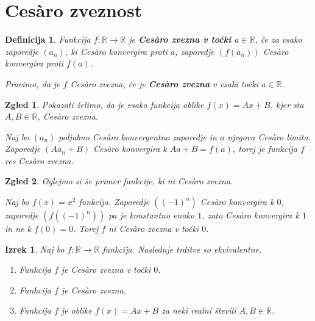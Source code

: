 \documentclass[10pt,hyperref={unicode}]{beamer}
\newtheorem{izrek}{Izrek}
\newtheorem{definicija}{Definicija}
\newtheorem{zgled}{Zgled}
\begin{document}
\section{Ces\`{a}ro zveznost}

\begin{frame}
    \begin{definicija}
        Funkcija $f: \mathbb{R} \rightarrow \mathbb{R}$ je \textbf{Ces\`{a}ro zvezna v točki $a \in \mathbb{R}$}, če za vsako zaporedje $(a_n)$, ki Ces\`{a}ro konvergira proti $a$, zaporedje $(f(a_n))$ Ces\`{a}ro konvergira proti $f(a)$. 
        
        Pravimo, da je $f$ Ces\`{a}ro zvezna, če je \textbf{Ces\`{a}ro zvezna} v vsaki točki $a \in \mathbb{R}$.
    \end{definicija}
\end{frame}

\begin{frame}
    \begin{zgled}
        Pokazati želimo, da je vsaka funkcija oblike $f(x) = Ax + B$, kjer sta $A, B \in \mathbb{R}$, Ces\`{a}ro zvezna. 
        \pause

        Naj bo $(a_n)$ poljubno Ces\`{a}ro konvergentno zaporedje in $a$ njegova Ces\`{a}ro limita. Zaporedje $(A a_n + B)$ Ces\`{a}ro konvergira k $A a + B = f(a)$, torej je funkcija $f$ res Ces\`{a}ro zvezna.
    \end{zgled}
    \pause
    \begin{zgled}
        Oglejmo si še primer funkcije, ki ni Ces\`{a}ro zvezna. 
        \pause

        Naj bo $f(x) = x^2$ funkcija. Zaporedje $((-1)^n)$ Ces\`{a}ro konvergira k $0$, zaporedje $(f((-1)^n))$ pa je konstantno enako $1$, zato Ces\`{a}ro konvergira k $1$ in ne k $f(0) = 0$. Torej $f$ ni Ces\`{a}ro zvezna v točki $0$.
    \end{zgled}
\end{frame}

\begin{frame}
    \begin{izrek}
        \label{klaszvez}
        Naj bo $f: \mathbb{R} \rightarrow \mathbb{R}$ funkcija. Naslednje trditve so ekvivalentne.
        \begin{enumerate}
            \item Funkcija $f$ je Ces\`{a}ro zvezna v točki $0$.
            \item Funkcija $f$ je Ces\`{a}ro zvezna.
            \item Funkcija $f$ je oblike $f(x) = Ax + B$ za neki realni števili $A, B \in \mathbb{R}$.
        \end{enumerate}
    \end{izrek}
\end{frame}
\end{document}
